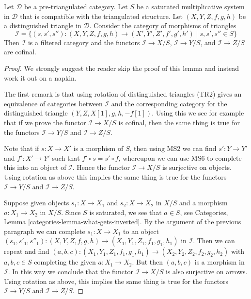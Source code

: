 \begin{lemma}
\label{lemma-limit-triangles}
Let $\mathcal{D}$ be a pre-triangulated category.
Let $S$ be a saturated multiplicative system in $\mathcal{D}$
that is compatible with the triangulated structure.
Let $(X, Y, Z, f, g, h)$ be a distinguished triangle in $\mathcal{D}$.
Consider the category of morphisms of triangles
$$
\mathcal{I} =
\{(s, s', s'') : (X, Y, Z, f, g, h) \to (X', Y', Z', f', g', h')
\mid s, s', s'' \in S\}
$$
Then $\mathcal{I}$ is a filtered category and the functors
$\mathcal{I} \to X/S$, $\mathcal{I} \to Y/S$, and $\mathcal{I} \to Z/S$
are cofinal.
\end{lemma}

\begin{proof}
We strongly suggest the reader skip the proof of this lemma and instead
work it out on a napkin.

\medskip\noindent
The first remark is that using rotation of distinguished triangles (TR2)
gives an equivalence of categories between $\mathcal{I}$ and the
corresponding category for the distinguished triangle
$(Y, Z, X[1], g, h, -f[1])$. Using this we see for example that if
we prove the functor $\mathcal{I} \to X/S$ is cofinal, then
the same thing is true for the functors $\mathcal{I} \to Y/S$ and
$\mathcal{I} \to Z/S$.

\medskip\noindent
Note that if $s : X \to X'$ is a morphism of $S$, then using
MS2 we can find $s' : Y \to Y'$ and $f' : X' \to Y'$ such that
$f' \circ s = s' \circ f$, whereupon we can use MS6 to complete
this into an object of $\mathcal{I}$. Hence the functor
$\mathcal{I} \to X/S$ is surjective on objects. Using rotation as above
this implies the same thing is true for the functors
$\mathcal{I} \to Y/S$ and $\mathcal{I} \to Z/S$.

\medskip\noindent
Suppose given objects $s_1 : X \to X_1 $ and $s_2 : X \to X_2$ in
$X/S$ and a morphism $a : X_1 \to X_2$ in $X/S$. Since $S$ is saturated,
we see that $a \in S$, see
Categories, Lemma \ref{categories-lemma-what-gets-inverted}.
By the argument of the previous paragraph we can complete
$s_1 : X \to X_1$ to an object
$(s_1, s'_1, s''_1) : (X, Y, Z, f, g, h) \to (X_1, Y_1, Z_1, f_1, g_1, h_1)$
in $\mathcal{I}$. Then we can repeat and find
$(a, b, c) : (X_1, Y_1, Z_1, f_1, g_1, h_1) \to (X_2, Y_2, Z_2, f_2, g_2, h_2)$
with $a, b, c \in S$ completing the given $a : X_1 \to X_2$.
But then $(a, b, c)$ is a morphism in $\mathcal{I}$.
In this way we conclude that the functor $\mathcal{I} \to X/S$ is
also surjective on arrows. Using rotation as above,
this implies the same thing is true for the functors
$\mathcal{I} \to Y/S$ and $\mathcal{I} \to Z/S$.


\end{proof}
